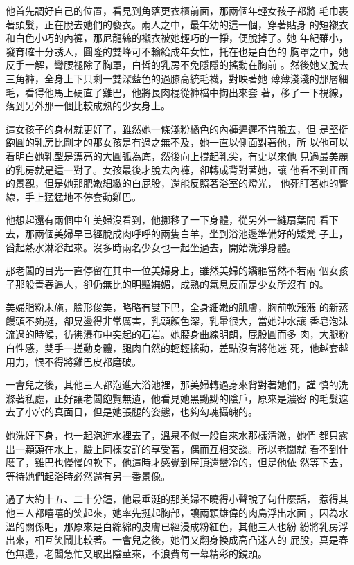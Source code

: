 他首先調好自己的位置，看見到角落更衣櫃前面，那兩個年輕女孩子都將
毛巾裹著頭髮，正在脫去她們的褻衣。兩人之中，最年幼的這一個，穿著貼身
的短襯衣和白色小巧的內褲，那尼龍絲的襯衣被她輕巧的一掙，便脫掉了。她
年紀雖小，發育確十分誘人，圓隆的雙峰可不輸給成年女性，托在也是白色的
胸罩之中，她反手一解，彎腰褪除了胸罩，白皙的乳房不免隱隱的搖動在胸前
。然後她又脫去三角褲，全身上下只剩一雙深藍色的過膝高統毛襪，對映著她
薄薄淺淺的那層細毛，看得他馬上硬直了雞巴，他將長肉棍從褲檔中掏出來套
著，移了一下視線，落到另外那一個比較成熟的少女身上。

這女孩子的身材就更好了，雖然她一條淺粉橘色的內褲遲遲不肯脫去，但
是堅挺飽圓的乳房比剛才的那女孩是有過之無不及，她一直以側面對著他，所
以他可以看明白她乳型是漂亮的大圓弧為底，然後向上撐起乳尖，有史以來他
見過最美麗的乳房就是這一對了。女孩最後才脫去內褲，卻轉成背對著她，讓
他看不到正面的景觀，但是她那肥嫩細緻的白屁股，還能反照著浴室的燈光，
他死盯著她的臀線，手上猛猛地不停套動雞巴。

他想起還有兩個中年美婦沒看到，他挪移了一下身體，從另外一縫扇葉間
看下去，那兩個美婦早已經脫成肉呼呼的兩隻白羊，坐到浴池邊準備好的矮凳
子上，舀起熱水淋浴起來。沒多時兩名少女也一起坐過去，開始洗淨身體。

那老闆的目光一直停留在其中一位美婦身上，雖然美婦的嬌軀當然不若兩
個女孩子那般青春逼人，卻仍無比的明豔嫵媚，成熟的氣息反而是少女所沒有
的。

美婦脂粉未施，臉形俊美，略略有雙下巴，全身細嫩的肌膚，胸前軟漲漲
的新蒸饅頭不夠挺，卻晃盪得非常厲害，乳頭顏色深，乳暈很大，當她沖水讓
香皂泡沫流過的時候，彷彿瀑布中突起的石岩。她腰身曲線明朗，屁股圓而多
肉，大腿粉白性感，雙手一搓動身體，腿肉自然的輕輕搖動，差點沒有將他迷
死，他越套越用力，恨不得將雞巴皮都磨破。

一會兒之後，其他三人都泡進大浴池裡，那美婦轉過身來背對著她們，謹
慎的洗滌著私處，正好讓老闆飽覽無遺，他看見她黑黝黝的陰戶，原來是濃密
的毛髮遮去了小穴的真面目，但是她張腿的姿態，也夠勾魂攝魄的。

她洗好下身，也一起泡進水裡去了，溫泉不似一般自來水那樣清澈，她們
都只露出一顆頭在水上，臉上同樣安詳的享受著，偶而互相交談。所以老闆就
看不到什麼了，雞巴也慢慢的軟下，他這時才感覺到屋頂還蠻冷的，但是他依
然等下去，等待她們起浴時必然還有另一番景像。

過了大約十五、二十分鐘，他最垂涎的那美婦不曉得小聲說了句什麼話，
惹得其他三人都嘻嘻的笑起來，她率先挺起胸部，讓兩顆雄偉的肉島浮出水面
，因為水溫的關係吧，那原來是白綿綿的皮膚已經浸成粉紅色，其他三人也紛
紛將乳房浮出來，相互笑鬧比較著。一會兒之後，她們又翻身換成高凸迷人的
屁股，真是春色無邊，老闆急忙又取出陰莖來，不浪費每一幕精彩的鏡頭。

